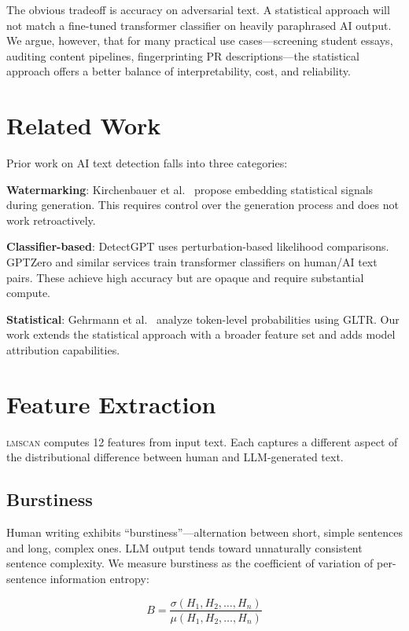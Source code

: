 \documentclass[11pt]{article}
\begin{document}
The obvious tradeoff is accuracy on adversarial text. A statistical approach will not match a fine-tuned transformer classifier on heavily paraphrased AI output. We argue, however, that for many practical use cases---screening student essays, auditing content pipelines, fingerprinting PR descriptions---the statistical approach offers a better balance of interpretability, cost, and reliability.

\section{Related Work}

Prior work on AI text detection falls into three categories:

\textbf{Watermarking}: Kirchenbauer et al.\ \cite{kirchenbauer2023watermark} propose embedding statistical signals during generation. This requires control over the generation process and does not work retroactively.

\textbf{Classifier-based}: DetectGPT \cite{mitchell2023detectgpt} uses perturbation-based likelihood comparisons. GPTZero and similar services train transformer classifiers on human/AI text pairs. These achieve high accuracy but are opaque and require substantial compute.

\textbf{Statistical}: Gehrmann et al.\ \cite{gehrmann2019gltr} analyze token-level probabilities using GLTR. Our work extends the statistical approach with a broader feature set and adds model attribution capabilities.

\section{Feature Extraction}

\textsc{lmscan} computes 12 features from input text. Each captures a different aspect of the distributional difference between human and LLM-generated text.

\subsection{Burstiness}

Human writing exhibits ``burstiness''---alternation between short, simple sentences and long, complex ones. LLM output tends toward unnaturally consistent sentence complexity. We measure burstiness as the coefficient of variation of per-sentence information entropy:

\begin{equation}
    B = \frac{\sigma(H_1, H_2, \ldots, H_n)}{\mu(H_1, H_2, \ldots, H_n)}
\end{equation}
\end{document}
